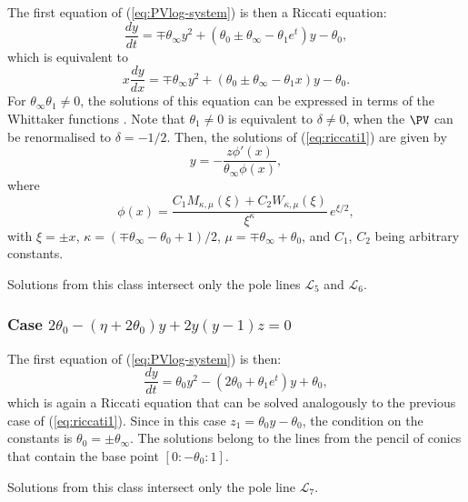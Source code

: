 The first equation of (\ref{eq:PVlog-system}) is then a Riccati equation:
$$
\frac{dy}{dt}=\mp\theta_{\infty} y^2+(\theta_0\pm\theta_{\infty}-\theta_1 e^t)y-\theta_0,
$$
which is equivalent to 
\begin{equation}\label{eq:riccati1}
x\frac{dy}{dx}=\mp\theta_{\infty} y^2+(\theta_0\pm\theta_{\infty}-\theta_1 x)y-\theta_0.
\end{equation}
For $\theta_{\infty}\theta_1\neq0$, the solutions of this equation can be expressed in terms of the Whittaker functions \cite{NISThandbook}.
Note that $\theta_1\neq0$ is equivalent to $\delta\neq0$, when the $\PV$ can be renormalised to $\delta=-1/2$.
Then, the solutions of (\ref{eq:riccati1}) are given by
$$
y=-\frac{z\phi'(x)}{\theta_{\infty}\phi(x)},
$$
where
$$
\phi(x)=\frac{C_1M_{\kappa,\mu}(\xi)+C_2W_{\kappa,\mu}(\xi)}{\xi^{\kappa}}\, e^{\xi/2},
$$
with $\xi=\pm x$, $\kappa=(\mp\theta_{\infty}-\theta_0+1)/2$, $\mu=\mp\theta_{\infty}+\theta_0$, and $C_1$, $C_2$ being arbitrary constants.

Solutions from this class intersect only the pole lines $\mathcal{L}_5$ and $\mathcal{L}_6$.

\subsubsection*{Case $2\theta_0-(\eta+2\theta_0)y+2y(y-1)z =0$}
The first equation of (\ref{eq:PVlog-system}) is then:
$$
\frac{dy}{dt}=\theta_0 y^2-(2\theta_0+\theta_1 e^t)y+\theta_0,
$$
which is again a Riccati equation that can be solved analogously to the previous case of (\ref{eq:riccati1}).
Since in this case $z_1=\theta_0 y-\theta_0$, the condition on the constants is $\theta_0=\pm\theta_{\infty}$.
The solutions belong to the lines from the pencil of conics that contain the base point $[0:-\theta_0:1]$.

Solutions from this class intersect only the pole line $\mathcal{L}_7$.